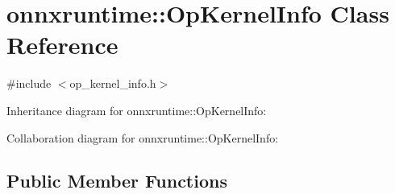 \hypertarget{classonnxruntime_1_1OpKernelInfo}{}\section{onnxruntime\+:\+:Op\+Kernel\+Info Class Reference}
\label{classonnxruntime_1_1OpKernelInfo}


{\ttfamily \#include $<$op\+\_\+kernel\+\_\+info.\+h$>$}



Inheritance diagram for onnxruntime\+:\+:Op\+Kernel\+Info\+:


Collaboration diagram for onnxruntime\+:\+:Op\+Kernel\+Info\+:
\subsection*{Public Member Functions}
